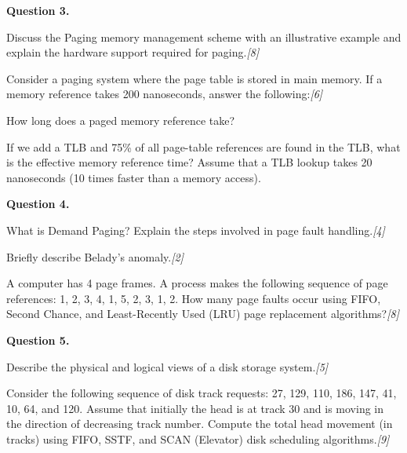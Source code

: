 \documentclass[11pt,a4paper]{article}
\newcommand{\pts}[1]{\hfill   \textit{[#1]}}
\begin{document}
\medskip


\noindent   \textbf{Question 3.}

\begin{parts}
  \item Discuss the Paging memory management scheme with an illustrative example and explain the hardware support required for paging.\pts{8}
  \item Consider a paging system where the page table is stored in main memory. If a memory reference takes 200 nanoseconds, answer the following:\pts{6}
  
\begin{parts}
    \item How long does a paged memory reference take?
    \item If we add a TLB and 75\% of all page-table references are found in the TLB, what is the effective memory reference time? Assume that a TLB lookup takes 20 nanoseconds (10 times faster than a memory access).
  \end{parts}
\end{parts}

\medskip


\noindent   \textbf{Question 4.}

\begin{parts}
  \item What is Demand Paging? Explain the steps involved in page fault handling.\pts{4}
  \item Briefly describe Belady's anomaly.\pts{2}
  \item A computer has 4 page frames. A process makes the following sequence of page references: 1, 2, 3, 4, 1, 5, 2, 3, 1, 2. How many page faults occur using FIFO, Second Chance, and Least-Recently Used (LRU) page replacement algorithms?\pts{8}
\end{parts}

\medskip


\noindent   \textbf{Question 5.}

\begin{parts}
  \item Describe the physical and logical views of a disk storage system.\pts{5}
  \item Consider the following sequence of disk track requests: 27, 129, 110, 186, 147, 41, 10, 64, and 120. Assume that initially the head is at track 30 and is moving in the direction of decreasing track number. Compute the total head movement (in tracks) using FIFO, SSTF, and SCAN (Elevator) disk scheduling algorithms.\pts{9}
\end{parts}
\end{document}
